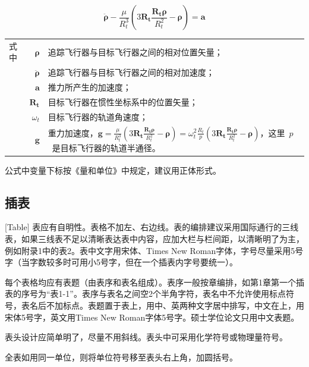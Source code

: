 \begin{equation}\label{eq:2}
  \ddot{\boldsymbol{\rho}}-\frac{\mu}{R_{t}^{3}}\left(3\mathbf{R_{t}}\frac{\mathbf{R_{t}\rho}}{R_{t}^{2}}-\boldsymbol{\rho}\right)=\mathbf{a}
\end{equation}
\begin{tabularx}{\textwidth}{@{}l@{\quad}r@{———}X@{}}
  式中& $\boldsymbol{\rho}$ &追踪飞行器与目标飞行器之间的相对位置矢量；\\
      &  $\boldsymbol{\ddot{\rho}}$&追踪飞行器与目标飞行器之间的相对加速度；\\
      &  $\mathbf{a}$   &推力所产生的加速度；\\
      &  $\mathbf{R_t}$ & 目标飞行器在惯性坐标系中的位置矢量；\\
      &  $\omega_{t}$ & 目标飞行器的轨道角速度；\\
      &  $\mathbf{g}$ & 重力加速度，$\mathbf{g}=\frac{\mu}{R_{t}^{3}}\left(
                        3\mathbf{R_{t}}\frac{\mathbf{R_{t}\rho}}{R_{t}^{2}}-\boldsymbol{\rho}\right)=\omega_{t}^{2}\frac{R_{t}}{p}\left(
                        3\mathbf{R_{t}}\frac{\mathbf{R_{t}\rho}}{R_{t}^{2}}-\boldsymbol{\rho}\right)$，这里~$p$~是目标飞行器的轨道半通径。
\end{tabularx}\vspace{\ccwd}

公式中变量下标按《量和单位》中规定，建议用正体形式。

\subsection{插表}[Table]
表应有自明性。表格不加左、右边线。表的编排建议采用国际通行的三线表，如果三线表不足以清晰表达表中内容，应加大栏与栏间距，以清晰明了为主，例如附录1中的表2。表中文字用宋体、Times New Roman字体，字号尽量采用5号字（当字数较多时可用小5号字，但在一个插表内字号要统一）。

每个表格均应有表题（由表序和表名组成）。表序一般按章编排，如第1章第一个插表的序号为“表1-1”。表序与表名之间空2个半角字符，表名中不允许使用标点符号，表名后不加标点。表题置于表上，用中、英两种文字居中排写，中文在上，用宋体5号字，英文用Times New Roman字体5号字。硕士学位论文只用中文表题。

表头设计应简单明了，尽量不用斜线。表头中可采用化学符号或物理量符号。

全表如用同一单位，则将单位符号移至表头右上角，加圆括号。


